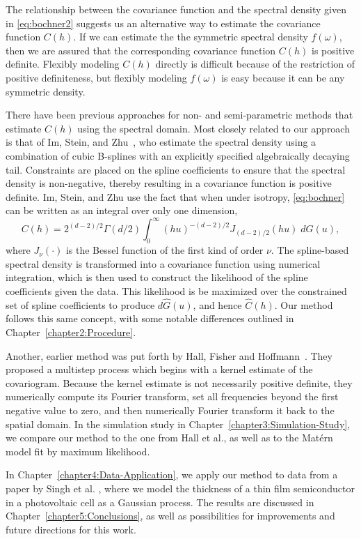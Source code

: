 The relationship between the covariance function and the spectral density given in \eqref{eq:bochner2} suggests us an alternative way to estimate the covariance function $C(h)$. If we can estimate the the symmetric spectral density $f(\omega)$, then we are assured that the corresponding covariance function $C(h)$ is positive definite.  Flexibly modeling $C(h)$ directly is difficult because of the restriction of positive definiteness, but flexibly modeling $f(\omega) $ is easy because it can be any symmetric density.

There have been previous approaches for non- and semi-parametric methods that estimate $C(h)$ using the spectral domain. Most closely related to our approach is that of Im, Stein, and Zhu~\cite{IM2007}, who estimate the spectral density using a combination of cubic B-splines with an explicitly specified algebraically decaying tail.   Constraints are placed on the spline coefficients to ensure that the spectral density is non-negative, thereby resulting in a covariance function is positive definite.  Im, Stein, and Zhu use the fact that when under isotropy, \eqref{eq:bochner} can be written as an integral over only one dimension,
\[
	C(h) = 2^{(d-2)/2}\Gamma(d/2) \int_0^\infty (hu)^{-(d-2)/2} J_{(d-2)/2}(hu) \; dG(u),
\]
where $J_\nu(\cdot)$ is the Bessel function of the first kind of order $\nu$. The spline-based spectral density is transformed into a covariance function using numerical integration, which is then used to construct the likelihood of the spline coefficients given the data.  This likelihood is be maximized over the constrained set of spline coefficients to produce $d\hat{G}(u)$, and hence $\hat{C}(h)$.  Our method follows this same concept, with some notable differences outlined in Chapter~\ref{chapter2:Procedure}.

Another, earlier method was put forth by Hall, Fisher and Hoffmann~\cite{Hall1994}. They proposed a multistep process which begins with a kernel estimate of the covariogram. Because the kernel estimate is not necessarily positive definite, they numerically compute its Fourier transform, set all frequencies beyond the first negative value to zero, and then numerically Fourier transform it back to the spatial domain. In the simulation study in Chapter~\ref{chapter3:Simulation-Study}, we compare our method to the one from Hall et al., as well as to the Mat\'ern model fit by maximum likelihood.

In Chapter~\ref{chapter4:Data-Application}, we apply our method to data from a paper by Singh et al. \cite{Singh2014}, where we model the thickness of a thin film semiconductor in a photovoltaic cell as a Gaussian process. The results are discussed in Chapter~\ref{chapter5:Conclusions}, as well as possibilities for improvements and future directions for this work.

